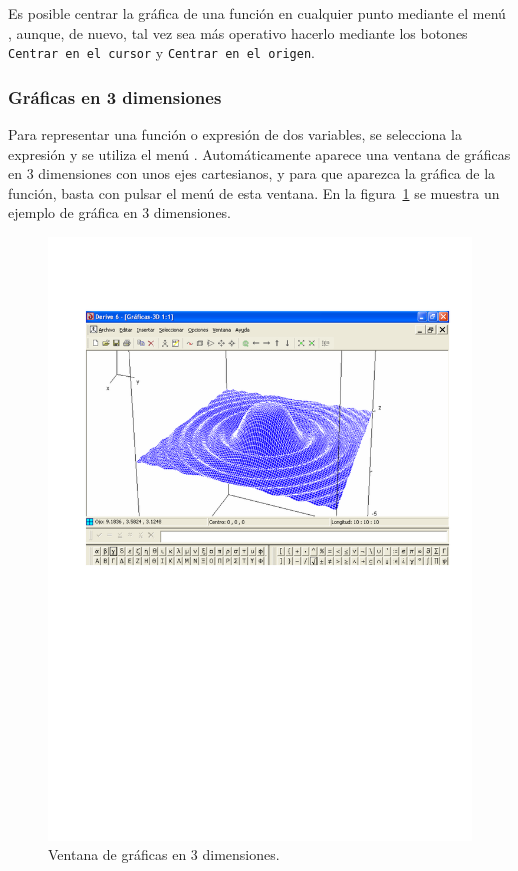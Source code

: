 Es posible centrar la gráfica de una función en cualquier punto
mediante el menú , aunque, de nuevo, tal vez sea más
operativo hacerlo mediante los botones \texttt{Centrar en el cursor}
y \texttt{Centrar en el origen}.

\subsubsection*{Gráficas en 3 dimensiones}
Para representar una función o expresión de dos variables, se
selecciona la expresión y se utiliza el menú . Automáticamente aparece una ventana de gráficas en 3
dimensiones con unos ejes cartesianos, y para que aparezca la
gráfica de la función, basta con pulsar el menú
 de esta ventana. En la
figura~\ref{g:3d-plot} se muestra un ejemplo de gráfica en 3
dimensiones.

\begin{figure}[h!]
\begin{center}
\includegraphics[scale=0.6]{img/introduccion_derive/3d-plot}
\caption{Ventana de gráficas en 3 dimensiones.} \label{g:3d-plot}
\end{center}
\end{figure}

